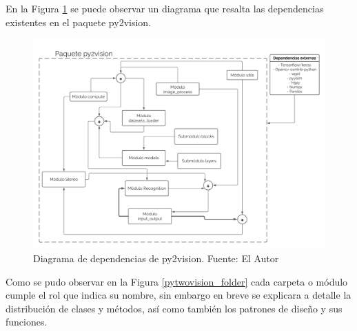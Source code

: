 En la Figura \ref{dependency_modules} se puede observar un diagrama que resalta las dependencias existentes en el paquete py2vision. 
\begin{figure}[H]
    \centering
    \includegraphics[scale=0.5]{Recursos/diagrama_dependencias.png}
    \caption[Diagrama de dependencias de py2vision.]{Diagrama de dependencias de py2vision. {\footnotesize Fuente: El Autor}}
    \label{dependency_modules}
\end{figure}
Como se pudo observar en la Figura \ref{pytwovision_folder} cada carpeta o módulo cumple el rol que indica su nombre, sin embargo en breve se explicara a detalle la distribución de clases y métodos, así como también los patrones de diseño y sus funciones.
